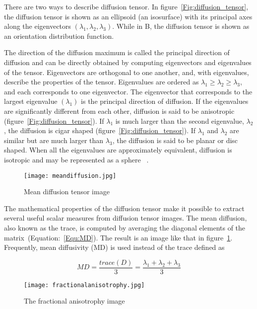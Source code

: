 There are two ways to describe diffusion tensor. In figure~\ref{Fig:diffusion_tensor}, the diffusion tensor is shown as an ellipsoid (an isosurface) with its principal axes along the eigenvectors $(\lambda_{1}, \lambda_{2}, \lambda_{3})$. While in B, the diffusion tensor is shown as an orientation distribution function. 

The direction of the diffusion maximum is called the principal direction of diffusion and can be directly obtained by computing eigenvectors and eigenvalues of the tensor. Eigenvectors are orthogonal to one another, and, with eigenvalues, describe the properties of the tensor. Eigenvalues are ordered as $\lambda_{1}\geq \lambda_{2}\geq \lambda_{3}$, and each corresponds to one eigenvector. The eigenvector that corresponds to the largest eigenvalue $(\lambda_{1})$ is the principal direction of diffusion. If the eigenvalues are significantly different from each other, diffusion is said to be anisotropic (figure~\ref{Fig:diffusion_tensor}). If $\lambda_{1}$ is much larger than the second eigenvalue, $\lambda_{2}$, the diffusion is cigar shaped (figure~\ref{Fig:diffusion_tensor}). If $\lambda_{1}$ and $\lambda_{2}$ are similar but are much larger than $\lambda_{3}$, the diffusion is said to be planar or disc shaped. When all the eigenvalues are approximately equivalent, diffusion is isotropic and may be represented as a sphere ~\cite{westin2002processing}.

\begin{figure} 
  \centering 
  \texttt{[image: meandiffusion.jpg]}
  \caption{Mean diffusion tensor image}
  \label{Fig:mean_diffusion}
\end{figure}

The mathematical properties of the diffusion tensor make it possible to extract several useful scalar measures from diffusion tensor images. The mean diffusion, also known as the trace, is computed by averaging the diagonal elements of the matrix~\cite{bihan2001tensor}(Equation:~\ref{Equ:MD}). The result is an image like that in figure~\ref{Fig:mean_diffusion}. Frequently, mean diffusivity (MD) is used instead of the trace defined as

\begin{equation}
   MD=\frac{trace(D)}{3}=\frac{\lambda_{1}+\lambda_{2}+\lambda_{3}}{3}
   \label{Equ:MD}	
\end{equation}

\begin{figure} 
  \centering 
  \texttt{[image: fractionalanisotrophy.jpg]}
  \caption{The fractional anisotrophy image}
  \label{Fig:fractional_anisotrophy}
\end{figure}

